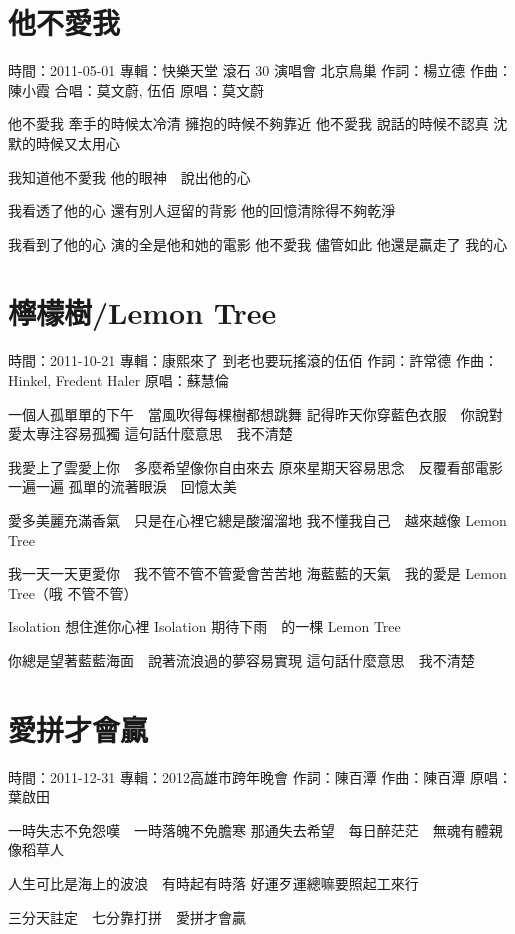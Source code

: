 \documentclass[UTF8,a4paper,oneside,twocolumn,12pt]{ctexbook}
\newcommand{\infopair}[2]{\textbullet #1：#2}
\newcommand{\zc}[1][伍佰]{\infopair{作詞}{#1}}
\newcommand{\zq}[1][伍佰]{\infopair{作曲}{#1}}
\newcommand{\zj}[1]{\infopair{專輯}{#1}}
\newcommand{\yc}[1]{\infopair{原唱}{#1}}
\newcommand{\sj}[1]{\infopair{時間}{#1}}
\newenvironment{info}{\begin{flushleft}\kaishu
	}
	{\end{flushleft}\normalsize\yahei\par}
\newenvironment{lyric}{
	}
{}
\begin{document}
\section{他不愛我}%
\begin{info}
	\sj{2011-05-01}
	\zj{快樂天堂 滾石 30 演唱會 北京鳥巢}
	\zc[楊立德]
	\zq[陳小霞]
	\infopair{合唱}{莫文蔚, 伍佰}
	\yc{莫文蔚}
\end{info}
\begin{lyric}
	他不愛我 牽手的時候太冷清 擁抱的時候不夠靠近
	他不愛我 說話的時候不認真 沈默的時候又太用心

	我知道他不愛我
	他的眼神　說出他的心

	我看透了他的心 還有別人逗留的背影
	他的回憶清除得不夠乾淨

	我看到了他的心 演的全是他和她的電影
	他不愛我 儘管如此 他還是贏走了 我的心
\end{lyric}

\section{檸檬樹/Lemon Tree}
\begin{info}
	\sj{2011-10-21}
	\zj{康熙來了 到老也要玩搖滾的伍佰}
	\zc[許常德]
	\zq[Hinkel, Fredent Haler]
	\yc{蘇慧倫}
\end{info}
\begin{lyric}
	一個人孤單單的下午　當風吹得每棵樹都想跳舞
	記得昨天你穿藍色衣服　你說對愛太專注容易孤獨
	這句話什麼意思　我不清楚

	我愛上了雲愛上你　多麼希望像你自由來去
	原來星期天容易思念　反覆看部電影一遍一遍
	孤單的流著眼淚　回憶太美

	愛多美麗充滿香氣　只是在心裡它總是酸溜溜地
	我不懂我自己　越來越像 Lemon Tree

	我一天一天更愛你　我不管不管不管愛會苦苦地
	海藍藍的天氣　我的愛是 Lemon Tree（哦 不管不管）

	Isolation 想住進你心裡
	Isolation 期待下雨　的一棵 Lemon Tree

	你總是望著藍藍海面　說著流浪過的夢容易實現
	這句話什麼意思　我不清楚
\end{lyric}

\section{愛拼才會贏}
\begin{info}
	\sj{2011-12-31}
	\zj{2012高雄市跨年晚會}
	\zc[陳百潭]
	\zq[陳百潭]
	\yc{葉啟田}
\end{info}
\begin{lyric}
	一時失志不免怨嘆　一時落魄不免膽寒
	那通失去希望　每日醉茫茫　無魂有體親像稻草人

	人生可比是海上的波浪　有時起有時落
	好運歹運總嘛要照起工來行

	三分天註定　七分靠打拼　愛拼才會贏
\end{lyric}
\end{document}
